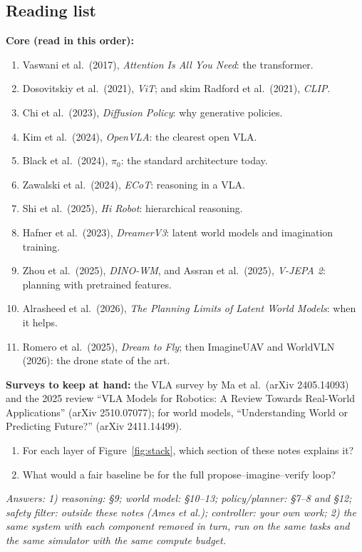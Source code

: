 \subsection{Reading list}
\textbf{Core (read in this order):}
\begin{enumerate}
\item Vaswani et al.\ (2017), \emph{Attention Is All You Need}: the transformer.
\item Dosovitskiy et al.\ (2021), \emph{ViT}; and skim Radford et al.\ (2021), \emph{CLIP}.
\item Chi et al.\ (2023), \emph{Diffusion Policy}: why generative policies.
\item Kim et al.\ (2024), \emph{OpenVLA}: the clearest open VLA.
\item Black et al.\ (2024), \emph{$\pi_0$}: the standard architecture today.
\item Zawalski et al.\ (2024), \emph{ECoT}: reasoning in a VLA.
\item Shi et al.\ (2025), \emph{Hi Robot}: hierarchical reasoning.
\item Hafner et al.\ (2023), \emph{DreamerV3}: latent world models and imagination training.
\item Zhou et al.\ (2025), \emph{DINO-WM}, and Assran et al.\ (2025), \emph{V-JEPA 2}: planning with pretrained features.
\item Alrasheed et al.\ (2026), \emph{The Planning Limits of Latent World Models}: when it helps.
\item Romero et al.\ (2025), \emph{Dream to Fly}; then ImagineUAV and WorldVLN (2026): the drone state of the art.
\end{enumerate}
\textbf{Surveys to keep at hand:} the VLA survey by Ma et al.\ (arXiv 2405.14093) and the 2025 review ``VLA Models for Robotics: A Review Towards Real-World Applications'' (arXiv 2510.07077); for world models, ``Understanding World or Predicting Future?'' (arXiv 2411.14499).

\begin{quizbox}
\begin{enumerate}[leftmargin=*]
\item For each layer of Figure~\ref{fig:stack}, which section of these notes explains it?
\item What would a fair baseline be for the full propose--imagine--verify loop?
\end{enumerate}
\emph{Answers: 1) reasoning: \S9; world model: \S10--13; policy/planner: \S7--8 and \S12; safety filter: outside these notes (Ames et al.); controller: your own work; 2) the same system with each component removed in turn, run on the same tasks and the same simulator with the same compute budget.}
\end{quizbox}

